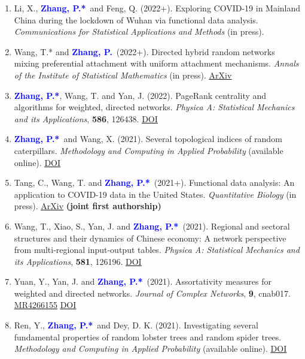 \documentclass{res}
\def\MR#1{\href{http://www.ams.org/mathscinet-getitem?mr=#1}{MR#1}}
\newcommand{\PZ}{\textbf{\textcolor{blue}{Zhang, P.*}}}
\newcommand{\PZnot}{\textbf{\textcolor{blue}{Zhang, P.}}}
\begin{document}
\begin{resume}
\begin{enumerate}
	\item {\sc Li, X.}, \PZ\ and {\sc Feng, Q.} (2022+). Exploring 
	COVID-19 in Mainland China during the lockdown of Wuhan via 
	functional data analysis. {\em Communications for Statistical 
	Applications and Methods} (in press).
	
	\item {\sc Wang, T.*} and \PZnot\ (2022+). Directed 
	hybrid random networks mixing preferential attachment with 
	uniform attachment mechanisms. {\em Annals of the Institute of 
	Statistical Mathematics} (in press). 
	\href{https://arxiv.org/pdf/2101.04611.pdf}{\underline{ArXiv}}
	
	\item \PZ, {\sc Wang, T.} and {\sc Yan, J.} (2022). PageRank 
	centrality and algorithms for weighted, directed networks. {\em 
	Physica A: Statistical Mechanics and its Applications}, {\bf 
	586}, 126438. 
	\href{https://doi.org/10.1016/j.physa.2021.126438}
	{\underline{DOI}}
	
	\item \PZ\ and {\sc Wang, X.} (2021). Several 
	topological indices of random caterpillars. 
	{\em Methodology and Computing in Applied Probability} 
	(available online). 
	\href{https://doi.org/10.1007/s11009-021-09895-1}
	{\underline{DOI}} 
	
	\item {\sc Tang, C., Wang, T.} and \PZ\ (2021+). 
	Functional data analysis: An application to COVID-19 data in
	the United States. {\em Quantitative Biology} (in press).
	\href{https://arxiv.org/pdf/2009.08363.pdf}
	{\underline{ArXiv}} {\bf \small (joint first authorship)}
	
	\item {\sc Wang, T., Xiao, S., Yan, J.} and \PZ\ 
	(2021). Regional and sectoral structures and their dynamics of
	Chinese economy: A network perspective from
	multi-regional input-output tables. {\em Physica A: Statistical 
	Mechanics and its Applications}, {\bf 581}, 126196.
	\href{https://doi.org/10.1016/j.physa.2021.126196}
	{\underline{DOI}}
	
	\item {\sc Yuan, Y., Yan, J.} and \PZ\ (2021). 
	Assortativity measures for weighted and directed
	networks. \emph{Journal of Complex Networks}, {\bf 9}, cnab017. 
	\MR{4266155} \href{https://doi.org/10.1093/comnet/cnab017}
	{\underline{DOI}}
	
	\item {\sc Ren, Y.}, \PZ\ and {\sc Dey, D. K.} (2021). 
	Investigating several fundamental properties of random 
	lobster trees and random spider trees. {\em Methodology and 
	Computing in Applied Probability} (available online). 
	\href{https://doi.org/10.1007/s11009-021-09863-9}
	{\underline{DOI}}
	

\end{enumerate}
\end{resume}
\end{document}
